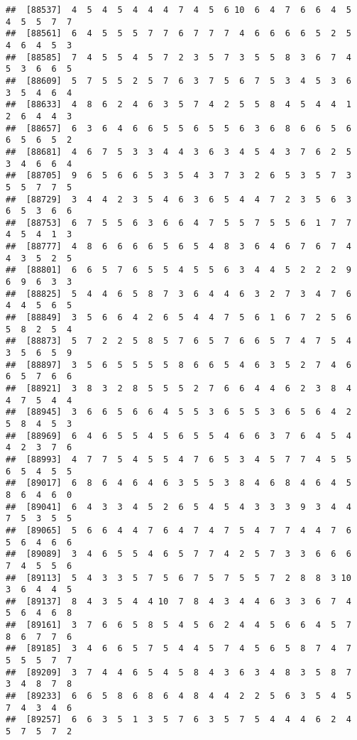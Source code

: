 \documentclass[
]{book}
\begin{document}
\begin{verbatim}
##  [88537]  4  5  4  5  4  4  4  7  4  5  6 10  6  4  7  6  6  4  5  4  5  5  7  7
##  [88561]  6  4  5  5  5  7  7  6  7  7  7  4  6  6  6  6  5  2  5  4  6  4  5  3
##  [88585]  7  4  5  5  4  5  7  2  3  5  7  3  5  5  8  3  6  7  4  5  3  6  6  5
##  [88609]  5  7  5  5  2  5  7  6  3  7  5  6  7  5  3  4  5  3  6  3  5  4  6  4
##  [88633]  4  8  6  2  4  6  3  5  7  4  2  5  5  8  4  5  4  4  1  2  6  4  4  3
##  [88657]  6  3  6  4  6  6  5  5  6  5  5  6  3  6  8  6  6  5  6  6  5  6  5  2
##  [88681]  4  6  7  5  3  3  4  4  3  6  3  4  5  4  3  7  6  2  5  3  4  6  6  4
##  [88705]  9  6  5  6  6  5  3  5  4  3  7  3  2  6  5  3  5  7  3  5  5  7  7  5
##  [88729]  3  4  4  2  3  5  4  6  3  6  5  4  4  7  2  3  5  6  3  6  5  3  6  6
##  [88753]  6  7  5  5  6  3  6  6  4  7  5  5  7  5  5  6  1  7  7  4  5  4  1  3
##  [88777]  4  8  6  6  6  6  5  6  5  4  8  3  6  4  6  7  6  7  4  4  3  5  2  5
##  [88801]  6  6  5  7  6  5  5  4  5  5  6  3  4  4  5  2  2  2  9  6  9  6  3  3
##  [88825]  5  4  4  6  5  8  7  3  6  4  4  6  3  2  7  3  4  7  6  4  4  5  6  5
##  [88849]  3  5  6  6  4  2  6  5  4  4  7  5  6  1  6  7  2  5  6  5  8  2  5  4
##  [88873]  5  7  2  2  5  8  5  7  6  5  7  6  6  5  7  4  7  5  4  3  5  6  5  9
##  [88897]  3  5  6  5  5  5  5  8  6  6  5  4  6  3  5  2  7  4  6  6  5  7  6  6
##  [88921]  3  8  3  2  8  5  5  5  2  7  6  6  4  4  6  2  3  8  4  4  7  5  4  4
##  [88945]  3  6  6  5  6  6  4  5  5  3  6  5  5  3  6  5  6  4  2  5  8  4  5  3
##  [88969]  6  4  6  5  5  4  5  6  5  5  4  6  6  3  7  6  4  5  4  4  2  3  7  6
##  [88993]  4  7  7  5  4  5  5  4  7  6  5  3  4  5  7  7  4  5  5  6  5  4  5  5
##  [89017]  6  8  6  4  6  4  6  3  5  5  3  8  4  6  8  4  6  4  5  8  6  4  6  0
##  [89041]  6  4  3  3  4  5  2  6  5  4  5  4  3  3  3  9  3  4  4  7  5  3  5  5
##  [89065]  5  6  6  4  4  7  6  4  7  4  7  5  4  7  7  4  4  7  6  5  6  4  6  6
##  [89089]  3  4  6  5  5  4  6  5  7  7  4  2  5  7  3  3  6  6  6  7  4  5  5  6
##  [89113]  5  4  3  3  5  7  5  6  7  5  7  5  5  7  2  8  8  3 10  3  6  4  4  5
##  [89137]  8  4  3  5  4  4 10  7  8  4  3  4  4  6  3  3  6  7  4  5  6  4  6  8
##  [89161]  3  7  6  6  5  8  5  4  5  6  2  4  4  5  6  6  4  5  7  8  6  7  7  6
##  [89185]  3  4  6  6  5  7  5  4  4  5  7  4  5  6  5  8  7  4  7  5  5  5  7  7
##  [89209]  3  7  4  4  6  5  4  5  8  4  3  6  3  4  8  3  5  8  7  3  4  8  7  8
##  [89233]  6  6  5  8  6  8  6  4  8  4  4  2  2  5  6  3  5  4  5  7  4  3  4  6
##  [89257]  6  6  3  5  1  3  5  7  6  3  5  7  5  4  4  4  6  2  4  5  7  5  7  2

\end{verbatim}
\end{document}
